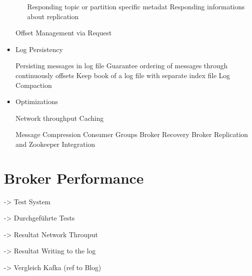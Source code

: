 \begin{itemize}
\begin{itemize}
        \fail Responding topic or partition specific metadat
        \fail Responding informations about replication 
    \end{itemize}
    \fail Offset Management via Request
    \item Log Persistency
    \begin{itemize}
        \tick Persisting messages in log file
        \tick Guarantee ordering of messages through continuously offsets
        \tick Keep book of a log file with separate index file 
        \fail Log Compaction 
    \end{itemize}
    \item Optimizations 
    \begin{itemize}
        \tick Network throughput 
        \tick Caching
    \end{itemize}
    \fail Message Compression 
    \fail Consumer Groups 
    \fail Broker Recovery
    \fail Broker Replication and Zookeeper Integration
   \end{itemize}

\section{Broker Performance}
-> Test System

-> Durchgeführte Tests 

-> Resultat Network Throuput 

-> Resultat Writing to the log 

-> Vergleich Kafka (ref to Blog) 


